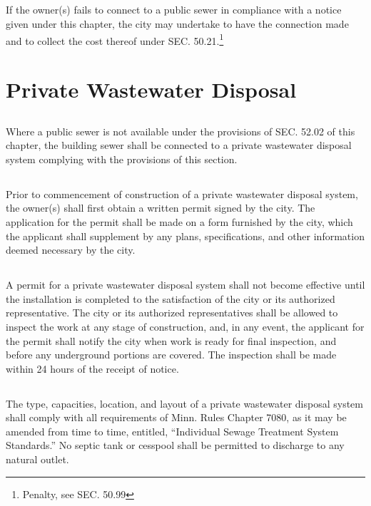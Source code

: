 \subsection{}
If the owner(s) fails to connect to a public sewer in compliance with a notice given under this chapter, the city may undertake to have the connection made and to collect the cost thereof under SEC. 50.21.\footnote{Penalty, see SEC. 50.99}

\section{Private Wastewater Disposal}
\subsection{}
Where a public sewer is not available under the provisions of SEC. 52.02 of this chapter, the building sewer shall be connected to a private wastewater disposal system complying with the provisions of this section.
\subsection{}
Prior to commencement of construction of a private wastewater disposal system, the owner(s) shall first obtain a written permit signed by the city.  The application for the permit shall be made on a form furnished by the city, which the applicant shall supplement by any plans, specifications, and other information deemed necessary by the city.
\subsection{}
A permit for a private wastewater disposal system shall not become effective until the installation is completed to the satisfaction of the city or its authorized representative.  The city or its authorized representatives shall be allowed to inspect the work at any stage of construction, and, in any event, the applicant for the permit shall notify the city when work is ready for final inspection, and before any underground portions are covered.  The inspection shall be made within 24 hours of the receipt of notice.
\subsection{}
The type, capacities, location, and layout of a private wastewater disposal system shall comply with all requirements of Minn. Rules Chapter 7080, as it may be amended from time to time, entitled, “Individual Sewage Treatment System Standards.” No septic tank or cesspool shall be permitted to discharge to any natural outlet.
